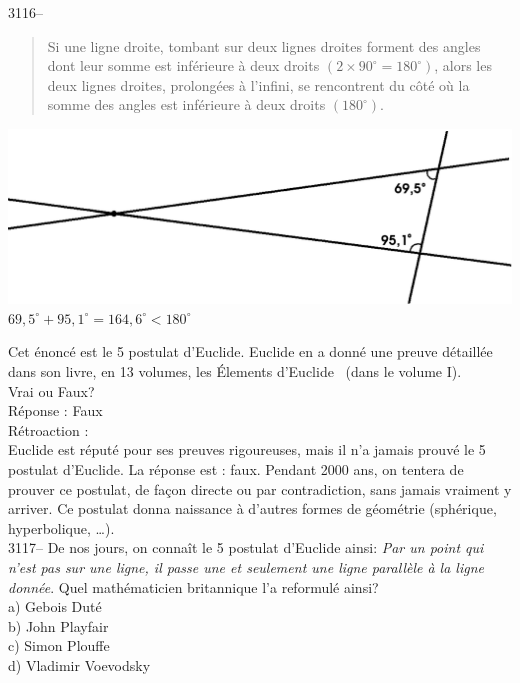 \documentclass[letterpaper, 12pt]{article}
\begin{document}
3116--\begin{quote}
\og Si une ligne droite, tombant sur deux lignes droites forment des angles dont leur somme est inf\'erieure \`a deux droits $(2 \times 90^\circ = 180^\circ)$, alors les deux lignes droites, prolong\'ees \`a l'infini, se rencontrent du c\^ot\'e o\`u la somme des angles est inf\'erieure \`a deux droits $(180^\circ)$. \fg
\end{quote}
\begin{center}
\includegraphics[scale=0.3]{5epostulat.eps}\\
$69,5^\circ + 95,1^\circ = 164,6^\circ < 180^\circ$
\end{center}

Cet \'enonc\'e est le 5\ieme{} postulat d'Euclide. Euclide en a donn\'e une preuve d\'etaill\'ee dans son livre, en 13 volumes, \og les \'Elements d'Euclide \fg \ (dans le volume I).\\
Vrai ou Faux?\\

R\'eponse : Faux\\

R\'etroaction :\\
Euclide est r\'eput\'e pour ses preuves rigoureuses, mais il n'a jamais prouv\'e le 5\ieme{} postulat d'Euclide. La r\'eponse est : faux. Pendant 2000 ans, on tentera de prouver ce postulat, de fa\c con directe ou par contradiction, sans jamais vraiment y arriver. Ce postulat donna naissance \`a d'autres formes de g\'eom\'etrie (sph\'erique, hyperbolique, \dots).\\



3117-- De nos jours, on conna\^it le 5\ieme{} postulat d'Euclide ainsi: \og \emph{Par un point qui n'est pas sur une ligne, il passe une et seulement une ligne parall\`ele \`a la ligne donn\'ee}\fg. Quel math\'ematicien britannique l'a reformul\'e ainsi?\\

a) Gebois Dut\'e\\
b) John Playfair\\
c) Simon Plouffe\\
d) Vladimir Voevodsky\\
\end{document}
